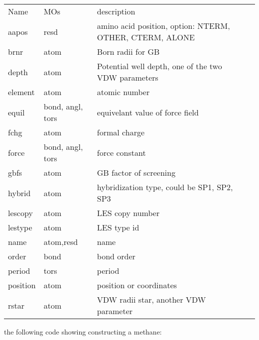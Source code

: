\documentclass[letterpaper]{book}
\begin{document}
\begin{tabular}{llll}

Name      &  MOs        &  description                                                     \\
aapos     &  resd       &  amino acid position, option:  NTERM, OTHER, CTERM, ALONE        \\
brnr      &  atom       &  Born radii for GB                                               \\
depth     &  atom       &  Potential well depth, one of the two VDW parameters             \\
element   &  atom       &  atomic number                                                   \\
equil     &  bond, angl, tors &  equivelant value of force field                           \\
fchg      &  atom       &  formal charge                                                   \\
force     &  bond, angl, tors & force constant                                             \\
gbfs      &  atom       &  GB factor of screening                                          \\
hybrid    &  atom       &  hybridization type, could be SP1, SP2, SP3                      \\
lescopy   &  atom       &  LES copy number                                                 \\
lestype   &  atom       &  LES type id                                                     \\
name      &  atom,resd  &  name                                                            \\
order     &  bond       &  bond order                                                      \\
period    &  tors       &  period                                                          \\
position  &  atom       &  position or coordinates                                         \\
rstar     &  atom       &  VDW radii star, another VDW parameter                           

\end{tabular}

the following code showing constructing a methane:
\end{document}
